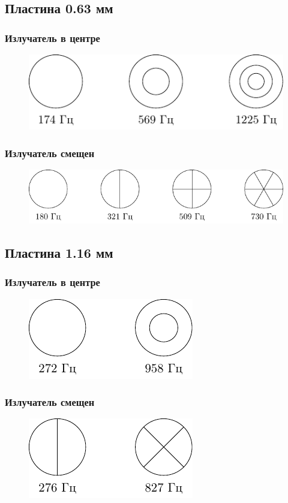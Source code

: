 \subsection{Пластина 0.63 мм}
\subsubsection{Излучатель в центре}
\begin{figure}[H]
	\centering
	\includegraphics[scale=1.5]{fig/63_c.pdf}
\end{figure}
\subsubsection{Излучатель смещен}
\begin{figure}[H]
	\centering
	\includegraphics[scale=1.5]{fig/63_b.pdf}
\end{figure}
\subsection{Пластина 1.16 мм}
\subsubsection{Излучатель в центре}
\begin{figure}[H]
	\centering
	\includegraphics[scale=1.5]{fig/116_c.pdf}
\end{figure}
\subsubsection{Излучатель смещен}
\begin{figure}[H]
	\centering
	\includegraphics[scale=1.5]{fig/116_b.pdf}
\end{figure}

